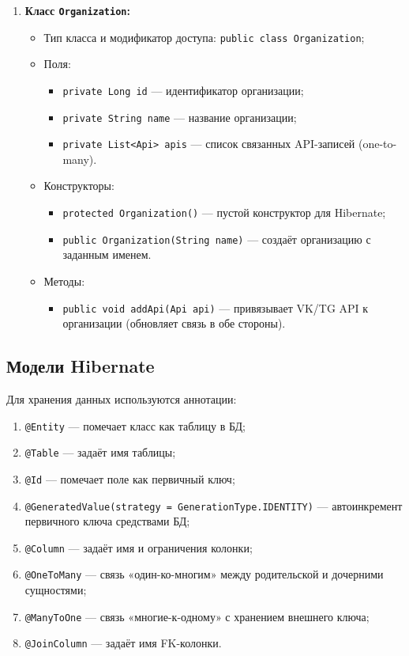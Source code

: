 \documentclass[11pt,a4paper]{article}
\begin{document}
\begin{enumerate}
    \item \textbf{Класс \texttt{Organization}:}
    \begin{itemize}
        \item Тип класса и модификатор доступа: \texttt{public class Organization};
        \item Поля:
        \begin{itemize}
            \item \texttt{private Long id} --- идентификатор организации;
            \item \texttt{private String name} --- название организации;
            \item \texttt{private List<Api> apis} --- список связанных API-записей (one-to-many).
        \end{itemize}
        \item Конструкторы:
        \begin{itemize}
            \item \texttt{protected Organization()} --- пустой конструктор для Hibernate;
            \item \texttt{public Organization(String name)} --- создаёт организацию с заданным именем.
        \end{itemize}
        \item Методы:
        \begin{itemize}
            \item \texttt{public void addApi(Api api)} --- привязывает VK/TG API к организации (обновляет связь в обе стороны).
        \end{itemize}
    \end{itemize}
\end{enumerate}

\newpage
\clearpage

\subsection*{Модели Hibernate}

Для хранения данных используются аннотации:
\begin{enumerate}
    \item \texttt{@Entity} --- помечает класс как таблицу в БД;
    \item \texttt{@Table} --- задаёт имя таблицы;
    \item \texttt{@Id} --- помечает поле как первичный ключ;
    \item \texttt{@GeneratedValue(strategy = GenerationType.IDENTITY)} --- автоинкремент первичного ключа средствами БД;
    \item \texttt{@Column} --- задаёт имя и ограничения колонки;
    \item \texttt{@OneToMany} --- связь «один-ко-многим» между родительской и дочерними сущностями;
    \item \texttt{@ManyToOne} --- связь «многие-к-одному» с хранением внешнего ключа;
    \item \texttt{@JoinColumn} --- задаёт имя FK-колонки.
\end{enumerate}
\end{document}
